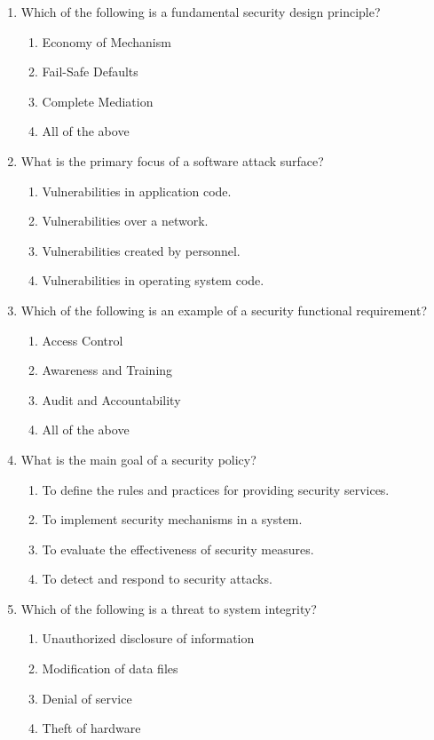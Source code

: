 \documentclass{article}
\begin{document}
\begin{enumerate}
    \item Which of the following is a fundamental security design principle?
    \begin{enumerate}
        \item Economy of Mechanism
        \item Fail-Safe Defaults
        \item Complete Mediation
        \item All of the above
    \end{enumerate}
    \newpage
    \item What is the primary focus of a software attack surface?
    \begin{enumerate}
        \item Vulnerabilities in application code.
        \item Vulnerabilities over a network.
        \item Vulnerabilities created by personnel.
        \item Vulnerabilities in operating system code.
    \end{enumerate}
    
    \item Which of the following is an example of a security functional requirement?
    \begin{enumerate}
        \item Access Control
        \item Awareness and Training
        \item Audit and Accountability
        \item All of the above
    \end{enumerate}
    
    \item What is the main goal of a security policy?
    \begin{enumerate}
        \item To define the rules and practices for providing security services.
        \item To implement security mechanisms in a system.
        \item To evaluate the effectiveness of security measures.
        \item To detect and respond to security attacks.
    \end{enumerate}
    
    \item Which of the following is a threat to system integrity?
    \begin{enumerate}
        \item Unauthorized disclosure of information
        \item Modification of data files
        \item Denial of service
        \item Theft of hardware
    \end{enumerate}
    

\end{enumerate}
\end{document}
